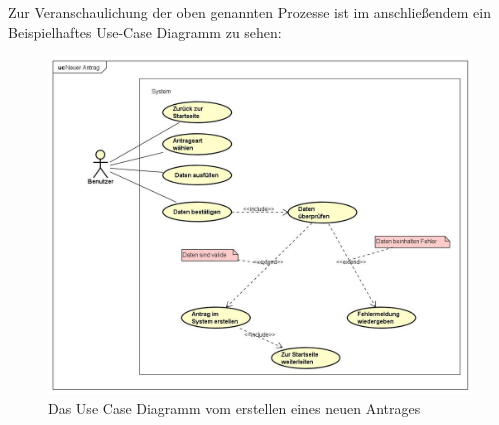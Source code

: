 Zur Veranschaulichung der oben genannten Prozesse ist im anschließendem ein Beispielhaftes Use-Case Diagramm zu sehen: 
\begin{figure}[H]
	\centering
	\includegraphics[width=1\linewidth]{images/uc-new}
	\caption[Use Case Diagramm Neuer Antrag]{Das Use Case Diagramm vom erstellen eines neuen Antrages}
	\label{fig:ucStart}
\end{figure}
\newpage
